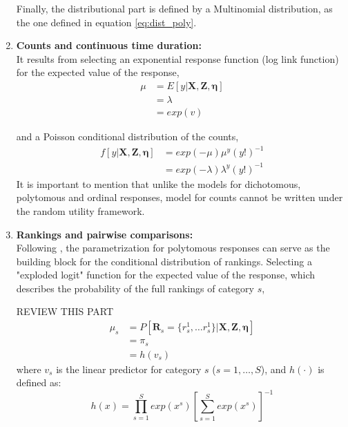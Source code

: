 \begin{enumerate}
	Finally, the distributional part is defined by a Multinomial distribution, as the one defined in equation \ref{eq:dist_poly}.
	
	
	
	\item \textbf{Counts and continuous time duration:} \\
	It results from selecting an exponential response function (log link function) for the expected value of the response,
	\begin{equation} \label{eq:link_count}
		\begin{split}
		\mu &= E[y | \mathbf{X}, \mathbf{Z}, \pmb{\eta}] \\
		&= \lambda \\
		&= exp(v)
		\end{split}
	\end{equation}
	
	and a Poisson conditional distribution of the counts,
	\begin{equation} \label{eq:dist_count}
		\begin{split}
		f[y| \mathbf{X}, \mathbf{Z}, \pmb{\eta}] &= exp(-\mu) \mu^{y} (y!)^{-1} \\
		&= exp(-\lambda) \lambda^{y} (y!)^{-1}
		\end{split}
	\end{equation}
	It is important to mention that unlike the models for dichotomous, polytomous and ordinal responses, model for counts cannot be written under the random utility framework.
	
	
	
	\item \textbf{Rankings and pairwise comparisons:} \\
	Following \citet{Skrondal_et_al_2003a}, the parametrization for polytomous responses can serve as the building block for the conditional distribution of rankings. Selecting a "exploded logit" function \citep{Chapaaan_et_al_1982} for the expected value of the response, which describes the probability of the full rankings of category $s$,
	
	{\color{red} REVIEW THIS PART
	\begin{equation} \label{eq:link_rank}
		\begin{split}
			\mu_{s} &= P[\mathbf{R}_{s}= \{ r_{s}^{1}, \dots r_{s}^{1}\} | \mathbf{X}, \mathbf{Z}, \pmb{\eta}] \\
			& = \pi_{s} \\
			&= h(v_{s})
		\end{split}
	\end{equation}	
	where $v_{s}$ is the linear predictor for category $s$ ($s=1, \dots, S$), and $h(\cdot)$ is defined as:
	\begin{equation} \label{eq:response_rank}
		h(x) = \prod_{s=1}^{S} exp(x^{s})\left[\sum_{s=1}^{S} exp(x^{s})\right]^{-1}
	\end{equation}

}
\end{enumerate}
